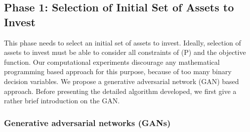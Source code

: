 \documentclass[11pt]{article}
\begin{document}
	\subsection{Phase 1: Selection of Initial Set of Assets to Invest}
	
	This phase needs to select an initial set of assets to invest. Ideally, selection of assets to invest must be able to consider all constraints of (P) and the objective function. Our computational experiments discourage any mathematical programming based approach for this purpose, because of too many binary decision variables. We propose a generative adversarial network (GAN) based approach. Before presenting the detailed algorithm developed, we first give a rather brief introduction on the GAN.
	
	
	\subsubsection{Generative adversarial networks (GANs)}
	
\end{document}
